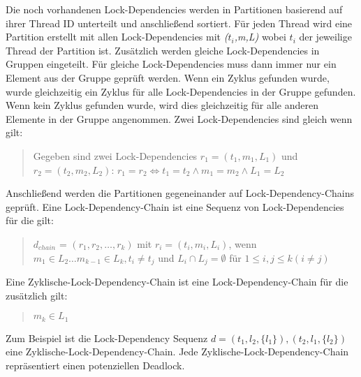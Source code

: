 Die noch vorhandenen Lock-Dependencies werden in Partitionen basierend auf ihrer
Thread ID unterteilt und anschließend sortiert. Für jeden Thread wird eine
Partition erstellt mit allen Lock-Dependencies mit \emph{($t_i$,m,L)} wobei
\emph{$t_i$} der jeweilige Thread der Partition ist. Zusätzlich werden gleiche
Lock-Dependencies in Gruppen eingeteilt. Für gleiche Lock-Dependencies muss dann
immer nur ein Element aus der Gruppe geprüft werden. Wenn ein Zyklus gefunden
wurde, wurde gleichzeitig ein Zyklus für alle Lock-Dependencies in der Gruppe
gefunden. Wenn kein Zyklus gefunden wurde, wird dies gleichzeitig für alle
anderen Elemente in der Gruppe angenommen. Zwei Lock-Dependencies sind gleich
wenn gilt:
\begin{quote}
  Gegeben sind zwei Lock-Dependencies \emph{$r_1 = (t_1, m_1, L_1)$} und
  \emph{$r_2 = (t_2, m_2, L_2)$}: $r_1 = r_2 \Leftrightarrow t_1 = t_2 \land m_1
  = m_2 \land L_1 = L_2 $
\end{quote}
Anschließend werden die Partitionen gegeneinander auf Lock-Dependency-Chains
geprüft. Eine Lock-Dependency-Chain ist eine Sequenz von Lock-Dependencies für
die gilt:
\begin{quote}
  \textbf{$d_{chain}$} = $(r_1, r_2, \dots , r_k)$ mit $r_i = (t_i, m_i, L_i)$,
  wenn $m_1 \in L_2 \dots m_{k-1} \in L_k, t_i \neq t_j$ und $L_i \cap L_j =
  \emptyset$ für $1 \leq i, j \leq k (i \neq j)$
\end{quote}
Eine Zyklische-Lock-Dependency-Chain ist eine Lock-Dependency-Chain für die
zusätzlich gilt:
\begin{quote}
  $m_k \in L_1$
\end{quote}
Zum Beispiel ist die Lock-Dependency Sequenz \emph{$d = (t_1, l_2, \{l_1\}),
(t_2, l_1, \{l_2\})$} eine Zyklische-Lock-Dependency-Chain. Jede
Zyklische-Lock-Dependency-Chain repräsentiert einen potenziellen Deadlock.